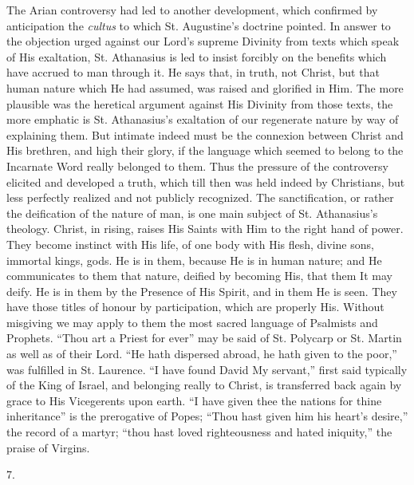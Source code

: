The Arian controversy had led to another development,
which confirmed by anticipation the \emph{cultus} to
which St. Augustine's doctrine pointed. In answer to the
objection urged against our Lord's supreme Divinity from
texts which speak of His exaltation, St. Athanasius is
led to insist forcibly on the benefits which have accrued
to man through it. He says that, in truth, not Christ,
but that human nature which He had assumed, was raised
and glorified in Him. The more plausible was the
heretical argument against His Divinity from those texts,
the more emphatic is St. Athanasius's exaltation of our
regenerate nature by way of explaining them. But intimate
indeed must be the connexion between Christ and His
brethren, and high their glory, if the language which
seemed to belong to the Incarnate Word really belonged to
them. Thus the pressure of the controversy elicited and
developed a truth, which till then was held indeed by
Christians, but less perfectly realized and not publicly
recognized. The sanctification, or rather the deification
of the nature of man, is one main subject of St.
Athanasius's theology. Christ, in rising, raises His
Saints with Him to the right hand of power. They become
instinct with His life, of one body with His flesh,
divine sons, immortal kings, gods. He is in them, because
He is in human nature; and He communicates to them that
nature, deified by becoming His, that them It may deify.
He is in them by the Presence of His Spirit, and in them
He is seen. They have those titles of honour by
participation, which are properly His. Without misgiving
we may apply to them the most sacred language of
Psalmists and Prophets. ``Thou art a Priest for
ever'' may be said of St. Polycarp or St. Martin as
well as of their Lord. ``He hath dispersed abroad, he
hath given to the poor,'' was fulfilled in St.
Laurence. ``I have found David My servant,''
first said typically of the King of Israel, and belonging
really to Christ, is transferred back again by grace to
His Vicegerents upon earth. ``I have given thee the
nations for thine inheritance'' is the prerogative of
Popes; ``Thou hast given him his heart's
desire,'' the record of a martyr; ``thou hast
loved righteousness and hated iniquity,'' the praise
of Virgins.

7.

